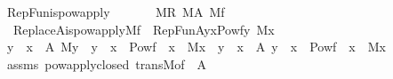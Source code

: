 \begin{isabellebody}
\isanewline
%
\endisadelimproof
\isanewline
{}\isamarkupfalse%
\ RepFun{\isacharunderscore}{\kern0pt}is{\isacharunderscore}{\kern0pt}powapply{\isacharcolon}{\kern0pt}\isanewline
\ \ \isanewline
\ \ \ \ {\isachardoublequoteopen}M{\isacharparenleft}{\kern0pt}R{\isacharparenright}{\kern0pt}{\isachardoublequoteclose}\ {\isachardoublequoteopen}M{\isacharparenleft}{\kern0pt}A{\isacharparenright}{\kern0pt}{\isachardoublequoteclose}\ {\isachardoublequoteopen}M{\isacharparenleft}{\kern0pt}f{\isacharparenright}{\kern0pt}{\isachardoublequoteclose}\ \isanewline
\ \ \isanewline
\ \ {\isachardoublequoteopen}Replace{\isacharparenleft}{\kern0pt}A{\isacharcomma}{\kern0pt}is{\isacharunderscore}{\kern0pt}powapply{\isacharparenleft}{\kern0pt}M{\isacharcomma}{\kern0pt}f{\isacharparenright}{\kern0pt}{\isacharparenright}{\kern0pt}\ {\isacharequal}{\kern0pt}\ RepFun{\isacharparenleft}{\kern0pt}A{\isacharcomma}{\kern0pt}{\isasymlambda}y{\isachardot}{\kern0pt}{\isacharbraceleft}{\kern0pt}x{\isasymin}Pow{\isacharparenleft}{\kern0pt}f{\isacharbackquote}{\kern0pt}y{\isacharparenright}{\kern0pt}{\isachardot}{\kern0pt}\ M{\isacharparenleft}{\kern0pt}x{\isacharparenright}{\kern0pt}{\isacharbraceright}{\kern0pt}{\isacharparenright}{\kern0pt}{\isachardoublequoteclose}\isanewline
%
\isadelimproof
%
\endisadelimproof
%
\isatagproof
{}\isamarkupfalse%
\ {\isacharminus}{\kern0pt}\isanewline
\ \ \isamarkupfalse%
\ {\isachardoublequoteopen}{\isacharbraceleft}{\kern0pt}y\ {\isachardot}{\kern0pt}\ x\ {\isasymin}\ A{\isacharcomma}{\kern0pt}\ M{\isacharparenleft}{\kern0pt}y{\isacharparenright}{\kern0pt}\ {\isasymand}\ y\ {\isacharequal}{\kern0pt}\ {\isacharbraceleft}{\kern0pt}x\ {\isasymin}\ Pow{\isacharparenleft}{\kern0pt}f\ {\isacharbackquote}{\kern0pt}\ x{\isacharparenright}{\kern0pt}\ {\isachardot}{\kern0pt}\ M{\isacharparenleft}{\kern0pt}x{\isacharparenright}{\kern0pt}{\isacharbraceright}{\kern0pt}{\isacharbraceright}{\kern0pt}\ {\isacharequal}{\kern0pt}\ {\isacharbraceleft}{\kern0pt}y\ {\isachardot}{\kern0pt}\ x\ {\isasymin}\ A{\isacharcomma}{\kern0pt}\ y\ {\isacharequal}{\kern0pt}\ {\isacharbraceleft}{\kern0pt}x\ {\isasymin}\ Pow{\isacharparenleft}{\kern0pt}f\ {\isacharbackquote}{\kern0pt}\ x{\isacharparenright}{\kern0pt}\ {\isachardot}{\kern0pt}\ M{\isacharparenleft}{\kern0pt}x{\isacharparenright}{\kern0pt}{\isacharbraceright}{\kern0pt}{\isacharbraceright}{\kern0pt}{\isachardoublequoteclose}\isanewline
\ \ \ \ \isamarkupfalse%
\ assms\ powapply{\isacharunderscore}{\kern0pt}closed\ transM{\isacharbrackleft}{\kern0pt}of\ {\isacharunderscore}{\kern0pt}\ A{\isacharbrackright}{\kern0pt}\ \isamarkupfalse%

\end{isabellebody}
